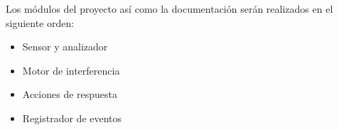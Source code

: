 Los módulos del proyecto así como la documentación serán realizados en el siguiente orden:

\begin{itemize}
	\item Sensor y analizador
	
	\item Motor de interferencia
	
	\item Acciones de respuesta
	
	\item Registrador de eventos\\
\end{itemize}